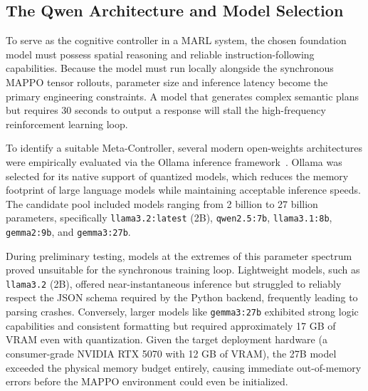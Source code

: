 \subsection{The Qwen Architecture and Model Selection}
\label{sec:qwen_architecture}

To serve as the cognitive controller in a MARL system, the chosen foundation model must possess spatial reasoning and reliable instruction-following capabilities. Because the model must run locally alongside the synchronous MAPPO tensor rollouts, parameter size and inference latency become the primary engineering constraints. A model that generates complex semantic plans but requires 30 seconds to output a response will stall the high-frequency reinforcement learning loop.

To identify a suitable Meta-Controller, several modern open-weights architectures were empirically evaluated via the Ollama inference framework~\parencite{ollama_2024}. Ollama was selected for its native support of quantized models, which reduces the memory footprint of large language models while maintaining acceptable inference speeds. The candidate pool included models ranging from 2 billion to 27 billion parameters, specifically \texttt{llama3.2:latest} (2B), \texttt{qwen2.5:7b}, \texttt{llama3.1:8b}, \texttt{gemma2:9b}, and \texttt{gemma3:27b}.

During preliminary testing, models at the extremes of this parameter spectrum proved unsuitable for the synchronous training loop. Lightweight models, such as \texttt{llama3.2} (2B), offered near-instantaneous inference but struggled to reliably respect the JSON schema required by the Python backend, frequently leading to parsing crashes. Conversely, larger models like \texttt{gemma3:27b} exhibited strong logic capabilities and consistent formatting but required approximately 17 GB of VRAM even with quantization. Given the target deployment hardware (a consumer-grade NVIDIA RTX 5070 with 12 GB of VRAM), the 27B model exceeded the physical memory budget entirely, causing immediate out-of-memory errors before the MAPPO environment could even be initialized.

